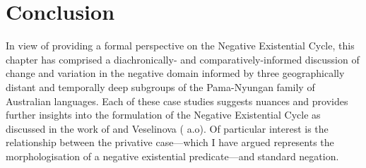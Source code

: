 \section{Conclusion}

In view of providing a formal perspective on the Negative Existential Cycle, this chapter has comprised a diachronically- and comparatively-informed discussion of change and variation in the negative domain informed by three geographically distant and temporally deep subgroups of the Pama-Nyungan family of Australian languages. Each of these case studies suggests nuances and provides further insights into the formulation of the Negative Existential Cycle as discussed in the work of \citet{Croft1991} and Veselinova (\citeyear{Veselinova2016} a.o). Of particular interest is the relationship between the privative case---which I have argued represents the morphologisation of a negative existential predicate---and standard negation.


